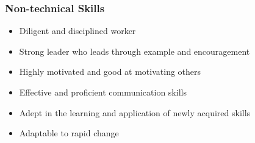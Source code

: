 	\subsubsection{Non-technical Skills}
		\begin{itemize}
			\item Diligent and disciplined worker
			\item Strong leader who leads through example and encouragement
			\item Highly motivated and good at motivating others
			\item Effective and proficient communication skills
			\item Adept in the learning and application of newly acquired skills
			\item Adaptable to rapid change
		\end{itemize}